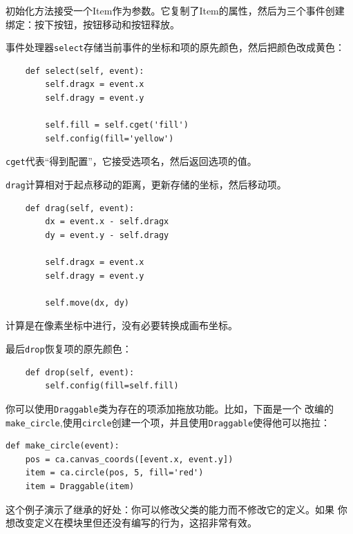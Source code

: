 初始化方法接受一个Item作为参数。它复制了Item的属性，然后为三个事件创建绑定：按下按钮，按钮移动和按钮释放。

事件处理器{\tt select}存储当前事件的坐标和项的原先颜色，然后把颜色改成黄色：


\beforeverb
\begin{verbatim}
    def select(self, event):
        self.dragx = event.x
        self.dragy = event.y

        self.fill = self.cget('fill')
        self.config(fill='yellow')
\end{verbatim}
\afterverb

{\tt cget}代表“得到配置”，它接受选项名，然后返回选项的值。

{\tt drag}计算相对于起点移动的距离，更新存储的坐标，然后移动项。


\beforeverb
\begin{verbatim}
    def drag(self, event):
        dx = event.x - self.dragx
        dy = event.y - self.dragy

        self.dragx = event.x
        self.dragy = event.y

        self.move(dx, dy)
\end{verbatim}
\afterverb

计算是在像素坐标中进行，没有必要转换成画布坐标。


最后{\tt drop}恢复项的原先颜色：

\beforeverb
\begin{verbatim}
    def drop(self, event):
        self.config(fill=self.fill)
\end{verbatim}
\afterverb

你可以使用{\tt Draggable}类为存在的项添加拖放功能。比如，下面是一个
改编的\verb"make_circle",使用{\tt circle}创建一个项，并且使用{\tt Draggable}使得他可以拖拉：

\beforeverb
\begin{verbatim}
def make_circle(event):
    pos = ca.canvas_coords([event.x, event.y])
    item = ca.circle(pos, 5, fill='red')
    item = Draggable(item)
\end{verbatim}
\afterverb

这个例子演示了继承的好处：你可以修改父类的能力而不修改它的定义。如果
你想改变定义在模块里但还没有编写的行为，这招非常有效。

